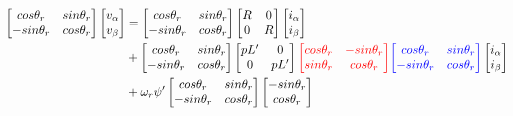 \begin{fleqn}[8pt]
{\begin{align}
    \begin{bmatrix}
        cos\theta_{r} & sin\theta_{r} \\
        -sin\theta_{r} & cos\theta_{r}
    \end{bmatrix}
    \begin{bmatrix}
        v_{\alpha} \\
        v_{\beta}
    \end{bmatrix}
    &=
    \begin{bmatrix}
        cos\theta_{r} & sin\theta_{r} \\
        -sin\theta_{r} & cos\theta_{r}
    \end{bmatrix}
    \begin{bmatrix}
        R & 0 \\
        0 & R
    \end{bmatrix}
    \begin{bmatrix}
        i_{\alpha} \\
        i_{\beta}
    \end{bmatrix}
    \notag \\
    &+
    \begin{bmatrix}
        cos\theta_{r} & sin\theta_{r} \\
        -sin\theta_{r} & cos\theta_{r}
    \end{bmatrix}
    \begin{bmatrix}
        pL' & 0 \\
        0 & pL'
    \end{bmatrix}
    \textcolor{red}{
    \begin{bmatrix}
        cos\theta_{r} & -sin\theta_{r} \\
        sin\theta_{r} & cos\theta_{r}
    \end{bmatrix}}
    \textcolor{blue}{
    \begin{bmatrix}
        cos\theta_{r} & sin\theta_{r} \\
        -sin\theta_{r} & cos\theta_{r}
    \end{bmatrix}}
    \begin{bmatrix}
        i_{\alpha} \\
        i_{\beta}
    \end{bmatrix}
    \notag \\
    &+ \omega_{r}\psi'
    \begin{bmatrix}
        cos\theta_{r} & sin\theta_{r} \\
        -sin\theta_{r} & cos\theta_{r}
    \end{bmatrix}
    \begin{bmatrix}
        -sin\theta_{r} \\
        cos\theta_{r}
    \end{bmatrix}
    \label{dq-proc}
\end{align}
}
\end{fleqn}

